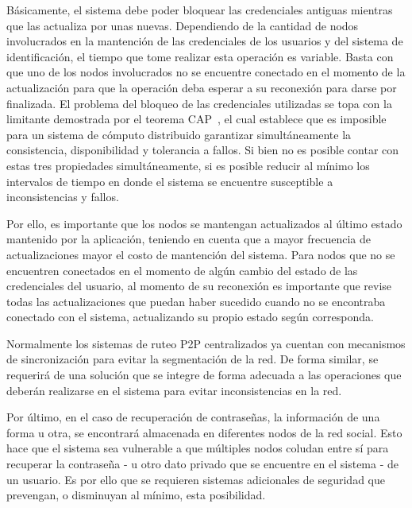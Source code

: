       Básicamente, el sistema debe poder bloquear las credenciales antiguas
      mientras que las actualiza por unas nuevas. Dependiendo de la cantidad de
      nodos involucrados en la mantención de las credenciales de los usuarios y
      del sistema de identificación, el tiempo que tome realizar esta operación
      es variable. Basta con que uno de los nodos involucrados no se encuentre
      conectado en el momento de la actualización para que la operación deba
      esperar a su reconexión para darse por finalizada.
      El problema del bloqueo de las credenciales utilizadas se topa con la
      limitante demostrada por el teorema CAP~\cite{cap_theorem}, el cual establece que es
      imposible para un sistema de cómputo distribuido garantizar
      simultáneamente la consistencia, disponibilidad y tolerancia a fallos.
      Si bien no es posible contar con estas tres propiedades simultáneamente,
      si es posible reducir al mínimo los intervalos de tiempo en donde el
      sistema se encuentre susceptible a inconsistencias y fallos.

      Por ello, es importante que los nodos se mantengan actualizados al último
      estado mantenido por la aplicación, teniendo en cuenta que a mayor
      frecuencia de actualizaciones mayor el costo de mantención del sistema.
      Para nodos que no se encuentren conectados en el momento de algún cambio
      del estado de las credenciales del usuario, al momento de su reconexión es importante que revise
      todas las actualizaciones que puedan haber sucedido cuando no se encontraba
      conectado con el sistema, actualizando su propio estado según corresponda.
      
      Normalmente los sistemas de ruteo P2P centralizados ya cuentan con
      mecanismos de sincronización para evitar la segmentación de la red. De
      forma similar, se requerirá de una solución que se integre de forma adecuada a
      las operaciones que deberán realizarse en el sistema para evitar
      inconsistencias en la red.
    
      Por último, en el caso de recuperación de contraseñas, la información de
      una forma u otra, se encontrará almacenada en diferentes nodos de la red
      social. Esto hace que el sistema sea vulnerable a que múltiples nodos coludan
      entre sí para recuperar la contraseña - u otro dato privado que se encuentre en
      el sistema - de un usuario. Es por ello que se requieren sistemas adicionales
      de seguridad que prevengan, o disminuyan al mínimo, esta posibilidad.


